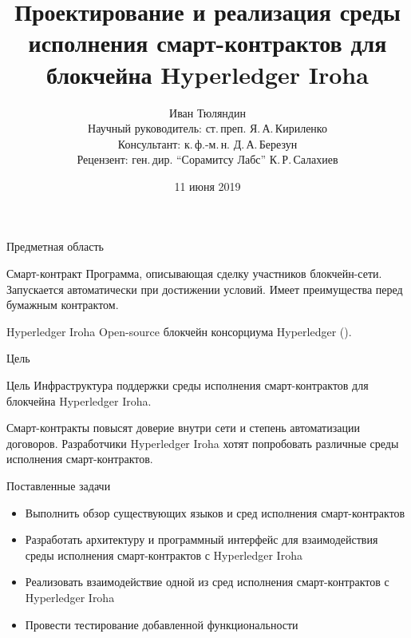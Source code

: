 \documentclass[hyperref={pdfpagelabels=false}]{beamer}
\begin{document}
  
\title[Смарт-контракты для Hyperledger Iroha]{Проектирование и реализация среды исполнения смарт-контрактов для блокчейна Hyperledger Iroha}  
\author[И. Тюляндин]{Иван Тюляндин\\%
Научный руководитель: ст.\,преп. Я.\,А.\,Кириленко\\%
Консультант: к.\,ф.-м.\,н. Д.\,А.\,Березун\\%
Рецензент: ген.\,дир. “Сорамитсу Лабс” К.\,Р.\,Салахиев%
} 
\date{11 июня 2019} 
{
}

\begin{frame}{Предметная область}
\begin{block}{Смарт-контракт} 
Программа, описывающая сделку участников блокчейн-сети. Запускается автоматически при достижении условий. 
Имеет преимущества перед бумажным контрактом.
\end{block}
\vfill
\begin{block}{Hyperledger Iroha}
Open-source блокчейн консорциума Hyperledger ({\color{blue}{https://github.com/hyperledger/iroha}}).
\end{block}
\end{frame} 

\begin{frame}{Цель}
\begin{block}{Цель}
Инфраструктура поддержки среды исполнения смарт-контрактов для блокчейна Hyperledger Iroha.
\end{block}
\vfill
Смарт-контракты повысят доверие внутри сети и степень автоматизации договоров.
Разработчики Hyperledger Iroha хотят попробовать различные среды исполнения смарт-контрактов.
\end{frame} 

\begin{frame}{Поставленные задачи}
\begin{itemize}
\item Выполнить обзор существующих языков и сред исполнения смарт-контрактов
\vfill
\item Разработать архитектуру и программный интерфейс для взаимодействия среды исполнения смарт-контрактов с Hyperledger Iroha
\vfill
\item Реализовать взаимодействие одной из сред исполнения смарт-контрактов с Hyperledger Iroha
\vfill
\item Провести тестирование добавленной функциональности
\end{itemize}

\end{frame} 
\end{document}
